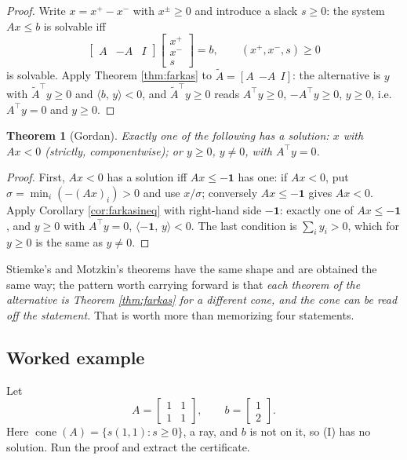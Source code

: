 \documentclass[11pt,a4paper]{article}
\theoremstyle{definition}
\theoremstyle{plain}
\newtheorem{theorem}{Theorem}
\theoremstyle{remark}
\newcommand{\ip}[2]{\langle #1,\, #2\rangle}
\DeclareMathOperator{\cone}{cone}
\newcommand{\one}{\mathbf{1}}
\begin{document}
\begin{proof}
Write $x=x^+-x^-$ with $x^\pm\ge0$ and introduce a slack $s\ge0$: the system $Ax\le b$ is
solvable iff
\[
\begin{bmatrix}A&-A&I\end{bmatrix}
\begin{bmatrix}x^+\\x^-\\s\end{bmatrix}=b,\qquad
(x^+,x^-,s)\ge0
\]
is solvable. Apply Theorem \ref{thm:farkas} to $\tilde A=[A\ \ {-A}\ \ I]$: the alternative is
$y$ with $\tilde A^\top y\ge0$ and $\ip{b}{y}<0$, and $\tilde A^\top y\ge0$ reads
$A^\top y\ge0$, $-A^\top y\ge0$, $y\ge0$, i.e.\ $A^\top y=0$ and $y\ge0$.
\end{proof}

\begin{theorem}[Gordan]
\label{thm:gordan}
Exactly one of the following has a solution: $x$ with $Ax<0$ (strictly, componentwise); or
$y\ge0$, $y\ne0$, with $A^\top y=0$.
\end{theorem}

\begin{proof}
First, $Ax<0$ has a solution iff $Ax\le-\one$ has one: if $Ax<0$, put
$\sigma=\min_i(-(Ax)_i)>0$ and use $x/\sigma$; conversely $Ax\le-\one$ gives $Ax<0$. Apply
Corollary \ref{cor:farkasineq} with right-hand side $-\one$: exactly one of $Ax\le-\one$, and
$y\ge0$ with $A^\top y=0$, $\ip{-\one}{y}<0$. The last condition is $\sum_iy_i>0$, which for
$y\ge0$ is the same as $y\ne0$.
\end{proof}

Stiemke's and Motzkin's theorems have the same shape and are obtained the same way; the pattern
worth carrying forward is that \emph{each theorem of the alternative is Theorem
\ref{thm:farkas} for a different cone, and the cone can be read off the statement.} That is
worth more than memorizing four statements.

\subsection*{Worked example}

Let
\[
A=\begin{bmatrix}1&1\\1&1\end{bmatrix},\qquad b=\begin{bmatrix}1\\2\end{bmatrix} .
\]
Here $\cone(A)=\{s(1,1):s\ge0\}$, a ray, and $b$ is not on it, so (I) has no solution. Run the
proof and extract the certificate.
\end{document}
